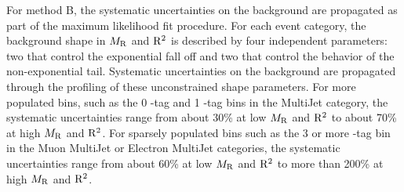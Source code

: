 For method B, the systematic uncertainties on the background are propagated as part of 
the maximum likelihood fit procedure. For each event category, the background shape in 
$M_\mathrm{R}$ and $\mathrm{R}^2$ is described by four independent parameters: two 
that control the exponential fall off and two that control the behavior of the
non-exponential tail. Systematic uncertainties on the background are propagated 
through the profiling of these unconstrained shape parameters. For more populated bins, such as 
the 0 \PQb-tag and 1 \PQb-tag bins in the MultiJet category, the systematic uncertainties range from
about 30\% at low $M_\mathrm{R}$ and $\mathrm{R}^2$ to about 70\% at high $M_\mathrm{R}$ and $\mathrm{R}^2$.
For sparsely populated bins such as the 3 or more \PQb-tag bin in the Muon MultiJet or Electron
MultiJet categories, the systematic uncertainties range from
about 60\% at low $M_\mathrm{R}$ and $\mathrm{R}^2$ to more than 200\% at high $M_\mathrm{R}$ and $\mathrm{R}^2$.

\begin{table}[!htb]
\begin{center}
\caption{Summary of the main instrumental and theoretical systematic uncertainties.}
\label{tab:BackgroundSystematics}
\end{center}
\end{table}

